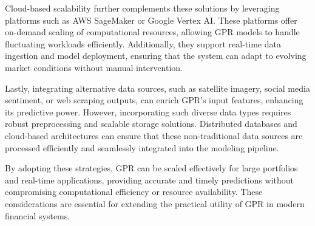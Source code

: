 Cloud-based scalability further complements these solutions by leveraging platforms such as AWS SageMaker or Google Vertex AI. These platforms offer on-demand scaling of computational resources, allowing GPR models to handle fluctuating workloads efficiently. Additionally, they support real-time data ingestion and model deployment, ensuring that the system can adapt to evolving market conditions without manual intervention.

Lastly, integrating alternative data sources, such as satellite imagery, social media sentiment, or web scraping outputs, can enrich GPR's input features, enhancing its predictive power. However, incorporating such diverse data types requires robust preprocessing and scalable storage solutions. Distributed databases and cloud-based architectures can ensure that these non-traditional data sources are processed efficiently and seamlessly integrated into the modeling pipeline.

By adopting these strategies, GPR can be scaled effectively for large portfolios and real-time applications, providing accurate and timely predictions without compromising computational efficiency or resource availability. These considerations are essential for extending the practical utility of GPR in modern financial systems.
